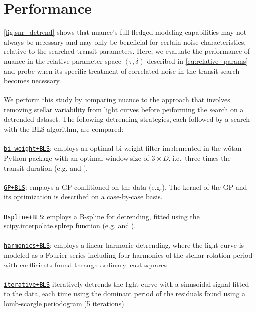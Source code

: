 \documentclass[modern]{aastex631}
\begin{document}
\section{Performance}\label{results}
\autoref{fig:snr_detrend} shows that \textsf{nuance}'s full-fledged modeling capabilities may not always be necessary and may only be beneficial for certain noise characteristics, relative to the searched transit parameters. Here, we evaluate the performance of \textsf{nuance} in the relative parameter space $(\tau, \delta)$ described in \autoref{eq:relative_params} and probe when its specific treatment of correlated noise in the transit search becomes necessary.\\\\
We perform this study by comparing \textsf{nuance} to the approach that involves removing stellar variability from light curves before performing the search on a detrended dataset. The following detrending strategies, each followed by a search with the BLS algorithm, are compared:\\\\
\ul{\texttt{bi-weight+BLS}}: employs an optimal bi-weight filter implemented in the \textsf{wõtan} Python package with an optimal window size of $3\times D$, i.e.\, three times the transit duration (e.g.\;\citealt{wotan} and \citealt{Dransfield2024}).\\\\
\ul{\texttt{GP+BLS}}: employs a GP conditioned on the data (e.g.\;\citealt{Lienhard2020}). The kernel of the GP and its optimization is described on a case-by-case basis.\\\\
\ul{\texttt{Bspline+BLS}}: employs a B-spline for detrending, fitted using the \textsf{scipy.interpolate.splrep} function (e.g.\;\citealt{wotan} and \citealt{Canocchi2023}).\\\\
\ul{\texttt{harmonics+BLS}}: employs a linear harmonic detrending, where the light curve is modeled as a Fourier series including four harmonics of the stellar rotation period with coefficients found through ordinary least squares.\\\\
\ul{\texttt{iterative+BLS}} iteratively detrends the light curve with a sinusoidal signal fitted to the data, each time using the dominant period of the residuals found using a lomb-scargle periodogram (5 iterations).\\\\
\end{document}
